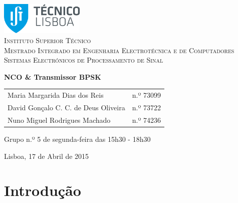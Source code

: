 \documentclass[11pt]{article}
\numberwithin{equation}{section}
\begin{document}
\begin{titlepage}
\begin{center}

\hfill \break
\hfill \break

\includegraphics[width=0.3\textwidth]{./logo}~\\[1cm] 

\textsc{\LARGE Instituto Superior Técnico}\\[0.25cm]
\textsc{\Large Mestrado Integrado em Engenharia Electrotécnica e de Computadores}\\[1.8cm]
\textsc{\huge Sistemas Electrónicos de Processamento de Sinal}\\[0.25cm]

\vspace{6mm}

{\huge \bfseries NCO \linebreak \& \linebreak Transmissor BPSK \\[1cm]}

\begin{tabular}{ l l }
Maria Margarida Dias dos Reis & \hspace{2mm} n.º 73099 \\
David Gonçalo C. C. de Deus Oliveira & \hspace{2mm} n.º 73722 \\
Nuno Miguel Rodrigues Machado & \hspace{2mm} n.º 74236
\end{tabular}

\vspace{7mm}

Grupo n.º 5 de segunda-feira das 15h30 - 18h30

\vfill

{\large Lisboa, 17 de Abril de 2015} 

\end{center}
\end{titlepage}

\clearpage

\tableofcontents
\pagebreak

\clearpage
{}

\section{Introdução}
\end{document}
